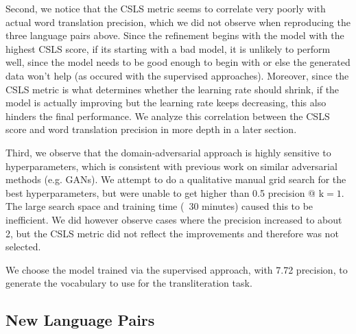 \documentclass{article}
\begin{document}
Second, we notice that the CSLS metric seems to correlate very poorly
with actual word translation precision, which we did not observe when reproducing
the three language pairs above. Since the refinement begins with the model with
the highest CSLS score, if its starting with a bad model, it is unlikely to
perform well, since the model needs to be good enough to begin with or else the
generated data won't help (as occured with the supervised approaches). Moreover,
since the CSLS metric is what determines whether the learning rate should shrink,
if the model is actually improving but the learning rate keeps decreasing, this
also hinders the final performance. We analyze this correlation between the CSLS
score and word translation precision in more depth in a later section.

Third, we observe that the domain-adversarial approach is highly sensitive to
hyperparameters, which is consistent with previous work on similar adversarial
methods (e.g. GANs). We attempt to do a qualitative manual grid search for
the best hyperparameters, but were unable to get higher than 0.5 precision @
$\text{k}=1$. The large search space and training time (~30 minutes) caused
this to be inefficient. We did however observe cases where the precision increased
to about 2, but the CSLS metric did not reflect the improvements and therefore
was not selected.

We choose the model trained via the supervised approach, with 7.72 precision, to
generate the vocabulary to use for the transliteration task.

\subsection*{New Language Pairs}
\end{document}
